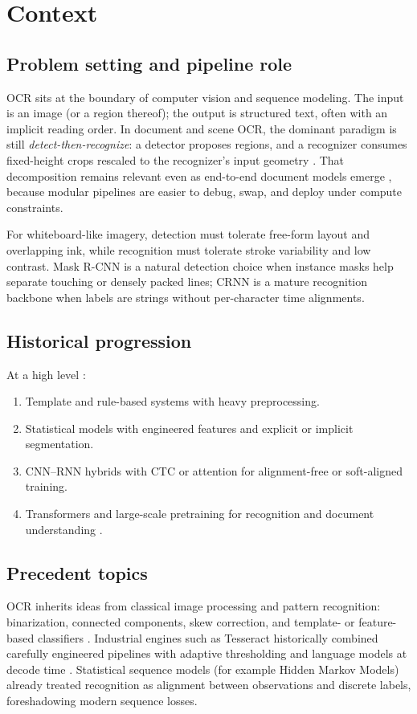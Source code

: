 \documentclass[11pt, a4paper]{article}
\begin{document}
\section{Context}
\subsection{Problem setting and pipeline role}
OCR sits at the boundary of computer vision and sequence modeling. The input is an image (or a region thereof); the output is structured text, often with an implicit reading order. In document and scene OCR, the dominant paradigm is still \emph{detect-then-recognize}: a detector proposes regions, and a recognizer consumes fixed-height crops rescaled to the recognizer's input geometry \cite{long2021survey,shi2016crnn}. That decomposition remains relevant even as end-to-end document models emerge \cite{kim2022donut}, because modular pipelines are easier to debug, swap, and deploy under compute constraints.

For whiteboard-like imagery, detection must tolerate free-form layout and overlapping ink, while recognition must tolerate stroke variability and low contrast. Mask R-CNN \cite{he2017maskrcnn} is a natural detection choice when instance masks help separate touching or densely packed lines; CRNN \cite{shi2016crnn} is a mature recognition backbone when labels are strings without per-character time alignments.

\subsection{Historical progression}
At a high level \cite{mori1999ocrsurvey,smith2007tesseract,shi2016crnn,baek2019str}:
\begin{enumerate}[leftmargin=*]
    \item Template and rule-based systems with heavy preprocessing.
    \item Statistical models with engineered features and explicit or implicit segmentation.
    \item CNN--RNN hybrids with CTC or attention for alignment-free or soft-aligned training.
    \item Transformers and large-scale pretraining for recognition and document understanding \cite{li2023trocr,kim2022donut}.
\end{enumerate}

\subsection{Precedent topics}
OCR inherits ideas from classical image processing and pattern recognition: binarization, connected components, skew correction, and template- or feature-based classifiers \cite{mori1999ocrsurvey}. Industrial engines such as Tesseract historically combined carefully engineered pipelines with adaptive thresholding and language models at decode time \cite{smith2007tesseract}. Statistical sequence models (for example Hidden Markov Models) already treated recognition as alignment between observations and discrete labels, foreshadowing modern sequence losses.
\end{document}

